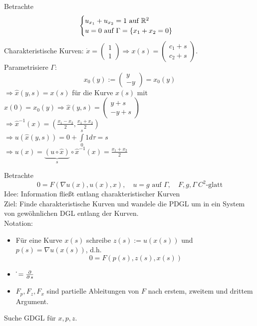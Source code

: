 \begin{bsp} \label{bsp_3}
	Betrachte \marginnote{[3]}
	\[ \begin{cases}
		u_{x_1} + u_{x_2} = 1 \text{ auf } \mathbb{R}^2 \\
		u = 0 \text{ auf } \Gamma = \{x_1 + x_2 = 0 \}
	\end{cases} \]
	Charakteristische Kurven: $\dot{x} = \begin{pmatrix} 1 \\ 1	\end{pmatrix} \Rightarrow x(s) = \begin{pmatrix} c_1 + s \\ c_2 + s \end{pmatrix}$. \\
	Parametrisiere $\Gamma$:
	\[ x_0(y) := \begin{pmatrix} y \\ -y \end{pmatrix} = x_0(y) \]
	$\Rightarrow \widehat{x}(y,s) = x(s)$ für die Kurve $x(s)$ mit $x(0) = x_0(y) \Rightarrow \widehat{x}(y,s) = \begin{pmatrix} y+s \\ -y+s \end{pmatrix}$ \\
	$\Rightarrow \widehat{x}^{-1}(x) = (\frac{x_1-x_2}{2},\frac{x_1+x_2}{2})$ \\
	$\Rightarrow u(\widehat{x}(y,s)) = 0 + \int\limits_{0}^{s} 1 d\tau = s$ \\
	$\Rightarrow u(x) = \underbrace{(u \circ \widehat{x})}_s \circ \widehat{x}^{-1}(x) = \frac{x_1+x_2}{2}$
\end{bsp}
	
	Betrachte
	\begin{equation}
		0 = F(\nabla u(x),u(x),x), \quad u=g \text{ auf } \Gamma, \quad F,g,\Gamma \ C^2\text{-glatt} \label{eq_2204_2}
	\end{equation}
	Idee: Information fließt entlang charakteristischer Kurven \\
	Ziel: Finde charakteristische Kurven und wandele die PDGL um in ein System von gewöhnlichen DGL entlang der Kurven. \\
	Notation: \begin{itemize}
	\item Für eine Kurve $x(s)$ schreibe $z(s) := u(x(s))$ und $p(s) = \nabla u(x(s))$, d.h.
	\[ 0 = F(p(s), z(s), x(s)) \]
	\item $\dot{} = \frac{\operatorname{\partial}}{\operatorname{\partial} s}$
	\item $F_p,F_z,F_x$ sind partielle Ableitungen von $F$ nach erstem, zweitem und drittem Argument.
	\end{itemize}
	Suche GDGL für $x,p,z$.
	
